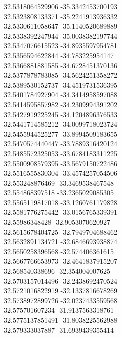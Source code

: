 {32.5318064529906	-35.3342453700193\\
32.5323808133371	-35.2241913936332\\
32.5330611058647	-35.1140520689889\\
32.5338392247944	-35.0038382197744\\
32.5347076615523	-34.8935597954781\\
32.5356594622844	-34.783225954147\\
32.5366881881585	-34.6728451370136\\
32.5377878783085	-34.5624251358272\\
32.5389530152737	-34.4519731536395\\
32.5401784927904	-34.3414958597088\\
32.5414595857982	-34.2309994391202\\
32.5427919225245	-34.1204896376533\\
32.5441714585212	-34.0099718023724\\
32.5455944525277	-33.8994509183655\\
32.5470574440447	-33.7889316420124\\
32.5485572325053	-33.6784183311225\\
32.5500908579395	-33.5679150722486\\
32.5516555830304	-33.4574257054506\\
32.553248876469	-33.3469538467548\\
32.554868397518	-33.2365029085305\\
32.5565119817018	-33.1260761179828\\
32.5581776275442	-33.0156765339391\\
32.55986348428	-32.9053070620927\\
32.5615678404725	-32.7949704688462\\
32.5632891134721	-32.6846693938874\\
32.5650258396568	-32.574406361615\\
32.5667766653973	-32.4641837915207\\
32.568540338696	-32.354004007625\\
32.5703157014496	-32.2438692470524\\
32.5721016822919	-32.1337816678269\\
32.5738972899726	-32.0237433559568\\
32.575701607234	-31.9137563318761\\
32.5775137851491	-31.8038225562988\\
32.579333037887	-31.6939439355414\\
}
